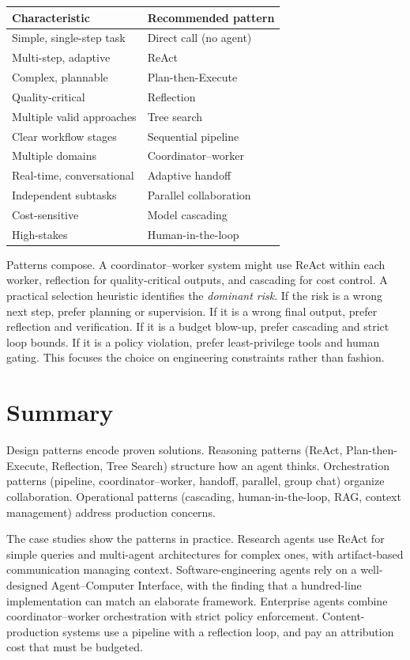 \documentclass[11pt]{book}
\begin{document}
\begin{center}
\begin{tabular}{ll}
\toprule
Characteristic & Recommended pattern \\
\midrule
Simple, single-step task & Direct call (no agent) \\
Multi-step, adaptive & ReAct \\
Complex, plannable & Plan-then-Execute \\
Quality-critical & Reflection \\
Multiple valid approaches & Tree search \\
Clear workflow stages & Sequential pipeline \\
Multiple domains & Coordinator--worker \\
Real-time, conversational & Adaptive handoff \\
Independent subtasks & Parallel collaboration \\
Cost-sensitive & Model cascading \\
High-stakes & Human-in-the-loop \\
\bottomrule
\end{tabular}
\end{center}

Patterns compose. A coordinator--worker system might use ReAct within each worker, reflection for quality-critical outputs, and cascading for cost control. A practical selection heuristic identifies the \textit{dominant risk}. If the risk is a wrong next step, prefer planning or supervision. If it is a wrong final output, prefer reflection and verification. If it is a budget blow-up, prefer cascading and strict loop bounds. If it is a policy violation, prefer least-privilege tools and human gating. This focuses the choice on engineering constraints rather than fashion.

\section{Summary}

Design patterns encode proven solutions. Reasoning patterns (ReAct, Plan-then-Execute, Reflection, Tree Search) structure how an agent thinks. Orchestration patterns (pipeline, coordinator--worker, handoff, parallel, group chat) organize collaboration. Operational patterns (cascading, human-in-the-loop, RAG, context management) address production concerns.

The case studies show the patterns in practice. Research agents use ReAct for simple queries and multi-agent architectures for complex ones, with artifact-based communication managing context. Software-engineering agents rely on a well-designed Agent--Computer Interface, with the finding that a hundred-line implementation can match an elaborate framework. Enterprise agents combine coordinator--worker orchestration with strict policy enforcement. Content-production systems use a pipeline with a reflection loop, and pay an attribution cost that must be budgeted.
\end{document}
